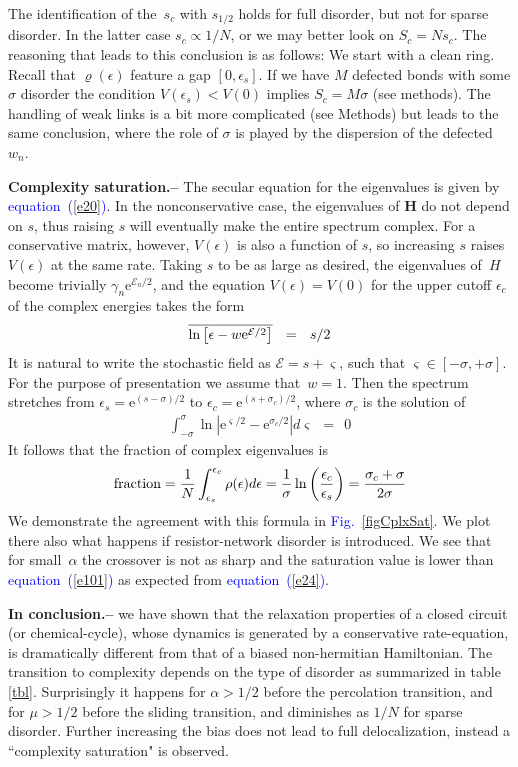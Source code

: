 \documentclass[aps,pre,floats,floatfix,twocolumn]{revtex4}
\newcommand{\eexp}[1]{\mathrm{e}^{#1}}
\newcommand{\be}[1]{\begin{eqnarray}\ifthenelse{#1=-1}{\nonumber}{\ifthenelse{#1=0}{}{\label{e#1}}}}
\newcommand{\beq}{\begin{eqnarray}}
\newcommand{\eeq}{\end{eqnarray}}
\newcommand{\Eq}[1]{\textcolor{blue}{{equation}\!~(\ref{#1})}}
\newcommand{\Fig}[1]{\textcolor{blue}{Fig.}\!\!~\ref{#1}}
\newcommand{\sect}[1]{{\bf #1.-- }}
\begin{document}
The identification of the~$s_c$ with $s_{1/2}$ holds for full disorder, 
but not for sparse disorder. In the latter case ${s_c \propto 1/N}$, 
or we may better look on ${S_c=Ns_c}$. 
The reasoning that leads to this conclusion is as follows: 
We start with a clean ring. Recall that $\varrho(\epsilon)$ 
feature a gap ${[0,\epsilon_s]}$. If we have $M$ defected 
bonds with some $\sigma$ disorder the condition ${V(\epsilon_s)<V(0)}$
implies ${S_c=M\sigma}$ (see methods).
The handling of weak links is a bit more complicated (see Methods)
but leads to the same conclusion, where the role of $\sigma$ 
is played by the dispersion of the defected~$w_n$.     
  



\sect{Complexity saturation}
%
The secular equation for the eigenvalues is given by \Eq{e20}.
%
In the nonconservative case, the eigenvalues of $\bm{H}$ do not depend on $s$,
thus raising $s$ will eventually make the entire spectrum complex. 
For a conservative matrix, however, $V(\epsilon)$ is also a function of $s$, 
so increasing $s$ raises $V(\epsilon)$  at the same rate.
%
Taking $s$ to be as large as desired, the eigenvalues of~$H$ 
become trivially $\gamma_{n}\eexp{\mathcal{E}_n/2}$, 
and the equation $V(\epsilon)=V(0)$ for the upper cutoff $\epsilon_c$ 
of the complex energies takes the form
%
\be{24}
\overline{\ln\left[ \epsilon - w\eexp{\mathcal{E}/2} \right]} \ \ = \ \ s/2 
\eeq
%
It is natural to write the stochastic field as $\mathcal{E}=s+\varsigma$, 
such that ${\varsigma\in[-\sigma,+\sigma]}$. 
For the purpose of presentation we assume that~$w{=}1$.  
Then the spectrum stretches from $\epsilon_s=\eexp{(s-\sigma)/2}$ 
to ${\epsilon_c=\eexp{(s+\sigma_c)/2}}$,  
where $\sigma_c$ is the solution of
%
\beq
\int_{-\sigma}^{\sigma} \ln \left| \eexp{{\varsigma}/2} - \eexp{\sigma_c /2}\right| d\varsigma  \ \ = \ \ 0 
\eeq
% 
It follows that the fraction of complex eigenvalues is 
%
\be{101}
\text{fraction} 
= \frac{1}{N}\int_{\epsilon_s}^{\epsilon_c} \rho(\epsilon) d\epsilon
= \frac{1}{\sigma}\ln\left( \frac{\epsilon_c}{\epsilon_s} \right) 
= \frac{\sigma_c + \sigma}{2\sigma}
\eeq
%
We demonstrate the agreement with this formula in \Fig{figCplxSat}.
We plot there also what happens if resistor-network disorder is introduced.
We see that for small~$\alpha$ the crossover is not as sharp and 
the saturation value is lower than \Eq{e101} as expected from \Eq{e24}. 


\sect{In conclusion}  
we have shown that the relaxation properties of a closed circuit (or chemical-cycle), 
whose dynamics is generated by a conservative rate-equation,  
is dramatically different from that of a biased non-hermitian Hamiltonian. 
The transition to complexity depends on the type of disorder as summarized in table \ref{tbl}. 
Surprisingly it happens for ${\alpha>1/2}$ before the percolation transition, 
and for ${\mu>1/2}$ before the sliding transition, and diminishes as $1/N$ for sparse disorder.
Further increasing the bias does not lead to full delocalization, instead a ``complexity saturation" is observed.
\end{document}
